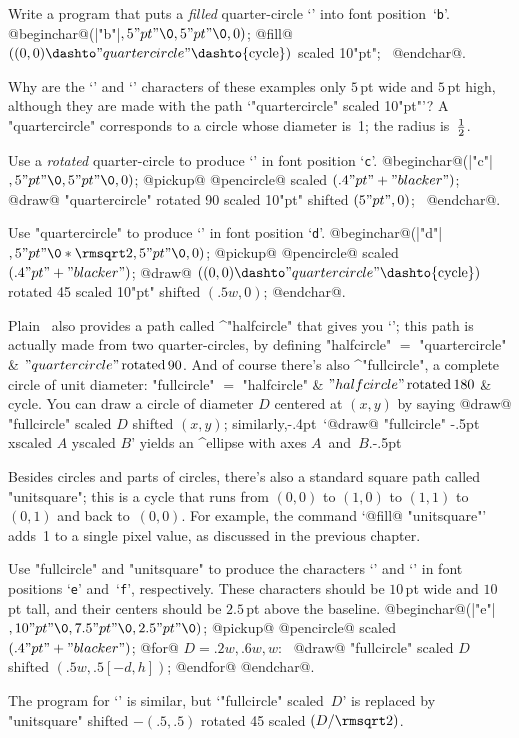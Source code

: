 {{{{\exercise
Write a program that puts a {\sl filled\/} quarter-circle
`\kern1pt{\manual\circb}' into font position~`{\tt b}'.
\answer @beginchar@\kern1pt(|"b"|$,5"pt"\0,5"pt"\0,0)$;\parbreak
@fill@ $((0,0)\dashto"quartercircle"\dashto{\rm cycle})$
scaled 10"pt"; \ @endchar@.

\exercise
Why are the `\kern1pt{\manual\circa}' and `\kern1pt{\manual\circb}'
characters of these examples only $5\,$pt wide and $5\,$pt high, although
they are made with the path `"quartercircle" scaled 10"pt"'?
\answer A "quartercircle" corresponds to a circle whose diameter
is~1; the radius is~$1\over2$.

\dangerexercise
Use a {\sl rotated\/} quarter-circle to produce `{\manual\circc}\kern1pt'
in font position `{\tt c}'.
\answer @beginchar@\kern1pt(|"c"|$,5"pt"\0,5"pt"\0,0)$;\parbreak
@pickup@ @pencircle@ scaled $(.4"pt"+"blacker")$;\parbreak
@draw@ "quartercircle" rotated 90 scaled 10"pt" shifted $(5"pt",0)$;
 \ @endchar@.

\dangerexercise
Use "quartercircle" to produce `\kern1pt{\manual\circd}\kern1pt'
in font position `{\tt d}'.
\answer @beginchar@\kern1pt(|"d"|$,5"pt"\0\ast\rmsqrt2,5"pt"\0,0)$;\parbreak
@pickup@ @pencircle@ scaled $(.4"pt"+"blacker")$;\parbreak
@draw@ $((0,0)\dashto"quartercircle"\dashto{\rm cycle})$
 rotated 45 scaled 10"pt" shifted $(.5w,0)$;\parbreak
@endchar@.

Plain \MF\ also provides a path called ^"halfcircle" that gives you
`{\manual\circc\circa}'; this path is actually made from two
quarter-circles, by defining
\begindisplay
"halfcircle" $=$ "quartercircle" \& $"quartercircle"\,{\rm rotated}\,90$.
\enddisplay
And of course there's also ^"fullcircle", a complete circle of unit diameter:
\begindisplay
"fullcircle" $=$ "halfcircle" \& $"halfcircle"\,{\rm rotated}\,180$ \& cycle.
\enddisplay
You can draw a circle of diameter $D$ centered at $(x,y)$ by saying
\begindisplay
@draw@ "fullcircle" scaled $D$ shifted $(x,y)$;
\enddisplay
similarly,\kern-.4pt\ `@draw@ "fullcircle" \kern-.5pt
xscaled \kern-1pt$A$ yscaled \kern-1pt$B$'
yields an ^{ellipse} with axes $A$~and~$B$\kern-1.3pt.\kern-.5pt

Besides circles and parts of circles, there's also a standard square path
called "unitsquare"; this is a cycle that runs from $(0,0)$ to $(1,0)$
to $(1,1)$ to $(0,1)$ and back to~$(0,0)$. For example, the command
`@fill@ "unitsquare"' adds~1 to a single pixel value, as discussed in
the previous chapter.

\exercise Use "fullcircle" and "unitsquare" to produce the characters
`{\manual\circe}' and `{\manual\circf}' in font positions `{\tt e}'
and~`{\tt f}', respectively. These characters should be $10\,$pt wide
and $10\,$pt tall, and their centers should be $2.5\,$pt above
the baseline.
\answer @beginchar@\kern1pt(|"e"|$,10"pt"\0,7.5"pt"\0,2.5"pt"\0)$;\parbreak
@pickup@ @pencircle@ scaled $(.4"pt"+"blacker")$;\parbreak
@for@ $D=.2w,.6w,w$: \
@draw@ "fullcircle" scaled $D$ shifted $(.5w,.5[-d,h])$;\parbreak
@endfor@ @endchar@.
\par\medskip\noindent
The program for `{\manual\circf}' is similar, but `"fullcircle"
scaled~$D$' is replaced by
\begindisplay
"unitsquare" shifted $-(.5,.5)$ rotated 45 scaled $(D/\rmsqrt2)$.
\enddisplay

}}}}
